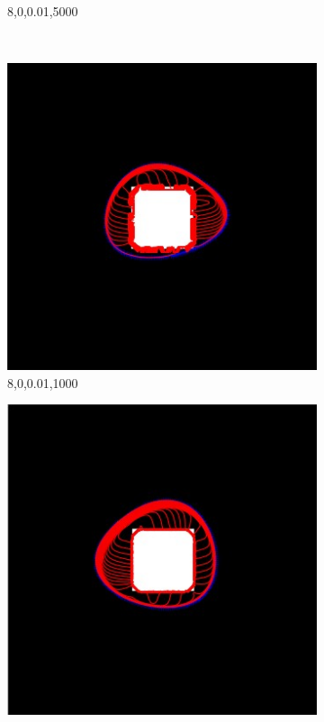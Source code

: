 \documentclass[paper=a4, fontsize=11pt]{scrartcl} %
\numberwithin{equation}{section} %
\numberwithin{figure}{section} %
\numberwithin{table}{section} %
\begin{document}
\begin{figure}[H]
\begin{subfigure}[b]{0.2\textwidth}
                \caption{8,0,0.01,5000}
                \label{fig:Blacksquare2}
        \end{subfigure}
        ~ %
        \begin{subfigure}[b]{0.2\textwidth}
                \includegraphics[width=\textwidth]{105}
                \caption{8,0,0.01,1000}
                \label{fig:Blacksquare3}
        \end{subfigure}
         \begin{subfigure}[b]{0.2\textwidth}
                \includegraphics[width=\textwidth]{108}

\end{subfigure}
\end{figure}
\end{document}
